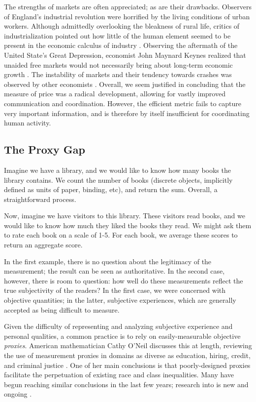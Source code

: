 \bigskip

The strengths of markets are often appreciated; as are their drawbacks.
Observers of England's industrial revolution were horrified by the living conditions of urban workers.
Although admittedly overlooking the bleakness of rural life, critics of industrialization pointed out how little of the human element seemed to be present in the economic calculus of industry \cite{heilbroner}.
Observing the aftermath of the United State's Great Depression, economist John Maynard Keynes realized that unaided free markets would not necessarily bring about long-term economic growth \cite{heilbroner}.
The instability of markets and their tendency towards crashes was observed by other economists \cite{minsky}.
Overall, we seem justified in concluding that the measure of price was a radical development, allowing for vastly improved communication and coordination.
However, the efficient metric fails to capture very important information, and is therefore by itself insufficient for coordinating human activity.


\subsection{The Proxy Gap}

Imagine we have a library, and we would like to know how many books the library contains. We count the number of books (discrete objects, implicitly defined as units of paper, binding, etc), and return the sum. Overall, a straightforward process.

Now, imagine we have visitors to this library. These visitors read books, and we would like to know how much they liked the books they read. We might ask them to rate each book on a scale of 1-5. For each book, we average these scores to return an aggregate score.

In the first example, there is no question about the legitimacy of the measurement; the result can be seen as authoritative. In the second case, however, there is room to question: how well do these measurements reflect the true subjectivity of the readers? In the first case, we were concerned with objective quantities; in the latter, subjective experiences, which are generally accepted as being difficult to measure.

\bigskip

Given the difficulty of representing and analyzing subjective experience and personal qualities, a common practice is to rely on easily-measurable objective \textit{proxies}.
American mathematician Cathy O'Neil discusses this at length, reviewing the use of measurement proxies in domains as diverse as education, hiring, credit, and criminal justice \cite{oneil}.
One of her main conclusions is that poorly-designed proxies facilitate the perpetuation of existing race and class inequalities.
Many have begun reaching similar conclusions in the last few years; research into  is new and ongoing \cite{tramer} \cite{friedler}.

